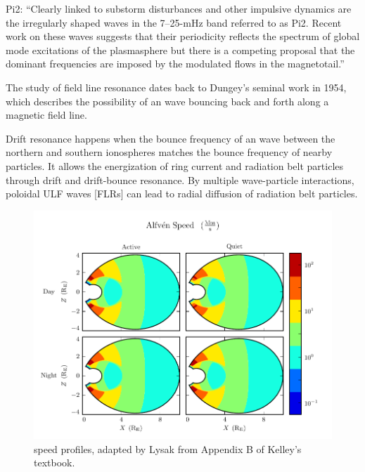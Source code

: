 Pi2: ``Clearly linked to substorm disturbances and other impulsive dynamics are the irregularly shaped waves in the 7--25-mHz band referred to as Pi2. Recent work on these waves suggests that their periodicity reflects the spectrum of global mode excitations of the plasmasphere but there is a competing proposal that the dominant frequencies are imposed by the modulated flows in the magnetotail.''\cite{kivelson_2006}







The study of field line resonance dates back to Dungey's seminal work in 1954\cite{dungey_1954}, which describes the possibility of an \Alfven wave bouncing back and forth along a magnetic field line.


Drift resonance happens when the bounce frequency of an \Alfven wave between the northern and southern ionospheres matches the bounce frequency of nearby particles. It allows the energization of ring current and radiation belt particles through drift and drift-bounce resonance\cite{elkington_1999,mann_2013,ozeke_2008,southwood_1976}. By multiple wave-particle interactions, poloidal ULF waves [FLRs] can lead to radial diffusion of radiation belt particles\cite{elkington_2003,ozeke_2012,tu_2012}.

\begin{figure}[H]
    \centering
    \includegraphics[width=\textwidth]{figures/va.pdf}
    \caption[\Alfven Speed Profiles]{
      \Alfven speed profiles, adapted by Lysak\cite{lysak_2013} from Appendix B of Kelley's textbook\cite{kelley_1989}. 
    }
    \label{fig_va}
\end{figure}

